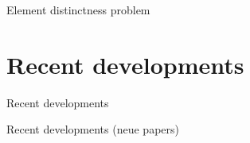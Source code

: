 \documentclass{beamer}
\newcommand{\chapterframe}[1]{\begin{frame}\centering\huge{#1}\end{frame}}
\begin{document}
\begin{frame}{Element distinctness problem}
\end{frame}



\section{Recent developments}
\chapterframe{Recent developments}

\begin{frame}{Recent developments}
(neue papers)
\end{frame}
\end{document}

